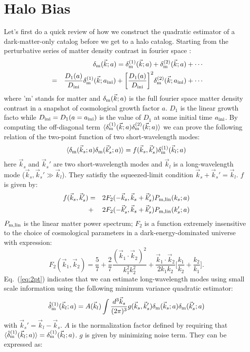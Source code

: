 \documentclass[prd,amsmath,amssymb,floatfix,superscriptaddress,nofootinbib,twocolumn]{revtex4-1}
\def\be{\begin{equation}}
\def\ee{\end{equation}}
\def\bea{\begin{eqnarray}}
\def\eea{\end{eqnarray}}
\newcommand{\ini}{\rm ini}
\newcommand{\vs}{\nonumber\\}
\newcommand{\vk}{\vec{k}}
\newcommand{\ec}[1]{Eq.~(\ref{eq:#1})}
\newcommand{\eql}[1]{\label{eq:#1}}
\begin{document}
\section{Halo Bias} \label{sec2}
\noindent Let's first do a quick review of how we construct the quadratic estimator of a dark-matter-only catalog \cite{Li:2020fir} before we get to a halo catalog. Starting from the perturbative series of matter density contrast in fourier space \cite{Jain:1994sop}\cite{Bernardeau:2002rev}:
\bea
&&\delta_{\rm m}(\vk;a)=\delta^{(1)}_{\rm m}(\vk;a)+\delta^{(2)}_{\rm m}(\vk;a)+\cdots\vs
&=&\frac{D_1(a)}{D_{\rm ini}}\delta^{(1)}_{\rm m}(\vk;a_{\ini})+\bigg[\frac{D_1(a)}{D_{\rm ini}}\bigg]^2\delta^{(2)}_{\rm m}(\vk;a_{\ini})+\cdots \eql{tayl}
\eea 
where 'm' stands for matter and $\delta_{\rm m}(\vk;a)$ is the full fourier space matter density contrast in a snapshot of cosmological growth factor $a$. $D_1$ is the linear growth facto while $D_{\ini} = D_1(a=a_{\ini})$ is the value of $D_1$ at some initial time $a_{\rm ini}$. By computing the off-diagonal term $\langle \delta_{\rm m}^{(1)}(\vk;a) \delta_{\rm m}^{(2)}(\vk;a) \rangle$ we can prove the following relation of the two-point function of two short-wavelength modes:
\be
\langle {\delta}_{\rm m}(\vec{k}_s;a){\delta}_{\rm m}(\vec{k}_s';a) \rangle =f(\vec{k}_s,\vec{k}_s'){\delta}^{(1)}_{\rm m}(\vec{k}_l;a) \eql{2pt}
\ee 
here $\vk_s$ and $\vk_s'$ are two short-wavelength modes and $\vk_l$ is a long-wavelength mode ($\vk_s,\vk_s' \gg \vk_l$). They satisfiy the squeezed-limit condition $\vk_s+\vk_s'=\vk_l$. $f$ is given by:
\bea
f(\vec{k}_s,\vec{k}_s')&=&2F_2(-\vec{k}_s,\vec{k}_s+\vec{k}_s')P_{\rm m,lin}(k_s;a)\vs
&+&2F_2(-\vec{k}_s',\vec{k}_s+\vec{k}_s')P_{\rm m,lin}(k_s';a)       
\eea 
$P_{\rm m,lin}$ is the linear matter power spectrum; $F_{2}$ is a function extremely insensitive to the choice of cosmological parameters in a dark-energy-dominated universe \cite{Takahashi:2008to} with expression:
\be
F_{2}(\vk_1,\vk_2)=\frac{5}{7}+\frac{2}{7}\frac{(\vk_1\cdot \vk_2)^2}{k_1^2 k_2^2}+\frac{\vk_1\cdot \vk_2}{2k_1k_2}\bigg[\frac{k_1}{k_2}+\frac{k_2}{k_1}\bigg].\eql{f2}
\ee
\ec{2pt} indicates that we can estimate long-wavelength modes using small scale information using the following minimum variance quadratic estimator:
\begin{eqnarray}
\hat{\delta}^{(1)}_{\rm m}(\vec{k}_l;a)=A(\vec{k}_l)\int \frac{d^3 \vec{k}_s}{(2\pi)^3} g(\vec{k}_s,\vec{k}_s'){\delta}_{\rm m}(\vec{k}_s;a){\delta}_{\rm m}(\vec{k}_s';a)\vs \eql{quadest}
\end{eqnarray} 
with $\vk_s'=\vk_l-\vk_s$. $A$ is the normalization factor defined by requiring that $\langle \hat{\delta}_{\rm m}^{(1)}(\vec{k}_l;a) \rangle={\delta}_{\rm m}^{(1)}(\vec{k}_l;a)$. $g$ is given by minimizing noise term. They can be expressed as:
\end{document}
